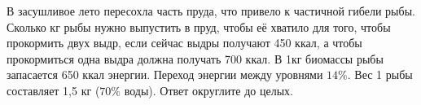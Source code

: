 
В засушливое лето пересохла часть пруда, что привело к частичной гибели
рыбы. Сколько кг рыбы нужно выпустить в пруд, чтобы её хватило для того, чтобы
прокормить двух выдр, если сейчас выдры получают 450 ккал, а чтобы прокормиться
одна выдра должна получать 700 ккал. В 1кг биомассы рыбы запасается 650 ккал
энергии. Переход энергии между уровнями $14\%$. 
Вес 1 рыбы составляет 1,5 кг ($70\%$ воды). Ответ округлите до целых.

\explanationSection

